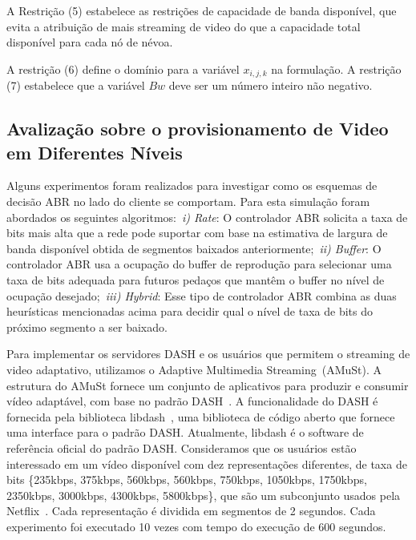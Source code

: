 A Restrição (5) estabelece as restrições de capacidade de banda disponível, que evita a atribuição de mais streaming de video do que a capacidade total disponível para cada nó de névoa.

A restrição (6) define o domínio para a variável $x_{i, j, k}$ na formulação. A restrição (7) estabelece que a variável $Bw$ deve ser um número inteiro não negativo.

\subsection{Avalização sobre o provisionamento de Video em Diferentes Níveis}
\label{subsec:evaluation}

Alguns experimentos foram realizados para investigar como os esquemas de decisão ABR no lado do cliente se comportam. Para esta simulação foram abordados os seguintes algoritmos:~\textit{i) Rate}: O controlador ABR solicita a taxa de bits mais alta
que a rede pode suportar com base na estimativa de largura de banda disponível obtida de segmentos baixados anteriormente;~\textit{ii) Buffer}: O controlador ABR usa a ocupação do buffer de reprodução para selecionar uma taxa de bits adequada para futuros pedaços que mantêm o buffer no nível de ocupação desejado;~\textit{iii) Hybrid}: Esse tipo de controlador ABR combina as duas heurísticas mencionadas acima para decidir qual o nível de taxa de bits do próximo segmento a ser baixado.
 


Para implementar os servidores DASH e os usuários que permitem o streaming de video adaptativo, utilizamos o Adaptive Multimedia Streaming~(AMuSt).
A estrutura do AMuSt fornece um conjunto de aplicativos para produzir e consumir vídeo adaptável, com base no padrão DASH~\cite{kreuzberger2016amust}. A funcionalidade do DASH é fornecida pela biblioteca libdash~\cite{mueller2013ICMEW}, uma biblioteca de código aberto que fornece uma interface para o padrão DASH. Atualmente, libdash é o software de referência oficial do padrão DASH.
Consideramos que os usuários estão interessado em um vídeo disponível com dez representações diferentes, de taxa de bits \{235kbps, 375kbps, 560kbps, 560kbps, 750kbps, 1050kbps, 1750kbps, 2350kbps, 3000kbps, 4300kbps, 5800kbps\}, que são um subconjunto usados pela Netflix~\cite{netflix:representation}.
Cada representação é dividida em segmentos de 2 segundos. Cada experimento foi executado 10 vezes com tempo do execução de 600 segundos.

